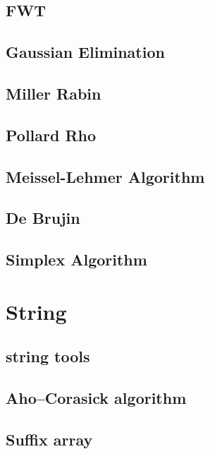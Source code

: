 \documentclass[a4paper,10pt,twocolumn,oneside]{article}
\begin{document}
\subsection{FWT}


\subsection{Gaussian Elimination}


\subsection{Miller Rabin}


\subsection{Pollard Rho}


\subsection{Meissel-Lehmer Algorithm}


\subsection{De Brujin}


\subsection{Simplex Algorithm}


\section{String}
\subsection{string tools}


\subsection{Aho–Corasick algorithm}


\subsection{Suffix array}

\end{document}
